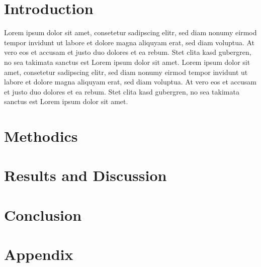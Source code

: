 \documentclass[10pt]{article}
\begin{document}
\section*{Introduction}
 Lorem ipsum dolor sit amet, consetetur sadipscing elitr, sed diam nonumy eirmod tempor invidunt ut labore et dolore magna aliquyam erat, sed diam voluptua. At vero eos et accusam et justo duo dolores et ea rebum. Stet clita kasd gubergren, no sea takimata sanctus est Lorem ipsum dolor sit amet. Lorem ipsum dolor sit amet, consetetur sadipscing elitr, sed diam nonumy eirmod tempor invidunt ut labore et dolore magna aliquyam erat, sed diam voluptua. At vero eos et accusam et justo duo dolores et ea rebum. Stet clita kasd gubergren, no sea takimata sanctus est Lorem ipsum dolor sit amet.  

	
\section*{Methodics}


\section*{Results and Discussion}


\section*{Conclusion}

\renewcommand\refname{Bibliography}
	
	 


\section*{Appendix}
\end{document}
